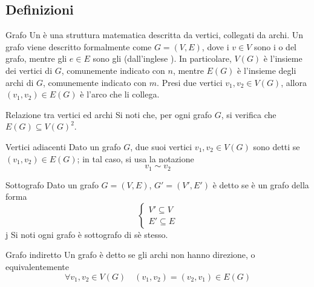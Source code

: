 \documentclass[a4paper, 12pt]{report}
\begin{document}
    \subsection{Definizioni}

    \begin{frameddefn}{Grafo}
        Un  è una struttura matematica descritta da vertici, collegati da archi. Un grafo viene descritto formalmente come $G=(V, E)$, dove i $v \in V$ sono i  o  del grafo, mentre gli $e \in E$ sono gli  (dall'inglese ). In particolare, $V(G)$ è l'insieme dei vertici di $G$, comunemente indicato con $n$, mentre $E(G)$ è l'insieme degli archi di $G$, comunemente indicato con $m$. Presi due vertici $v_1,v_2 \in V(G)$, allora $(v_1, v_2) \in E(G)$ è l'arco che li collega.
    \end{frameddefn}

    \begin{framedobs}{Relazione tra vertici ed archi}
        Si noti che, per ogni grafo $G$, si verifica che $E(G) \subseteq V(G)^2$.
    \end{framedobs}

    \begin{frameddefn}{Vertici adiacenti}
        Dato un grafo $G$, due suoi vertici $v_1, v_2 \in V(G)$ sono detti  se $(v_1, v_2) \in E(G)$; in tal caso, si usa la notazione $$v_1 \sim v_2$$
    \end{frameddefn}

    \begin{frameddefn}{Sottografo}
        Dato un grafo $G = (V, E)$, $G'=(V', E')$ è detto  se è un grafo della forma $$\left \{ \begin{array}{l} V' \subseteq V \\ E' \subseteq E \end{array} \right.$$j Si noti ogni grafo è sottografo di sè stesso.
    \end{frameddefn}

    \begin{frameddefn}{Grafo indiretto}
        Un grafo è detto  se gli archi non hanno direzione, o equivalentemente $$\forall v_1, v_2 \in V(G) \quad (v_1, v_2) = (v_2, v_1) \in E(G)$$
    \end{frameddefn}
\end{document}
